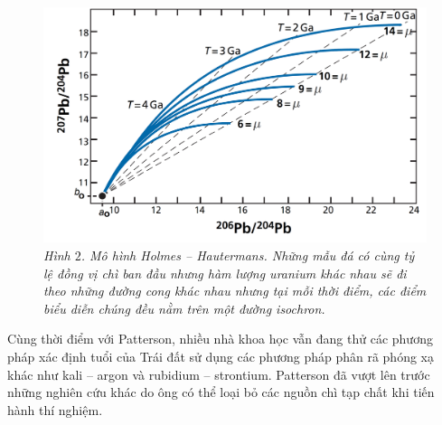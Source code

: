 \begin{multicols}{2}
	\begin{figure}[H]
		\vspace*{-5pt}
		\centering
		\captionsetup{labelformat= empty, justification=centering}
		\includegraphics[width= 1\linewidth]{2}
		\caption{\small\textit{\color{timhieukhoahoc}Hình $2$. Mô hình Holmes -- Hautermans. Những mẫu đá có cùng tỷ lệ đồng vị chì ban đầu nhưng hàm lượng uranium khác nhau sẽ đi theo những đường cong khác nhau nhưng tại mỗi thời điểm, các điểm biểu diễn chúng đều nằm trên một đường isochron.}}
	\end{figure}	
	Cùng thời điểm với Patterson, nhiều nhà khoa học vẫn đang thử các phương pháp xác định tuổi của Trái đất sử dụng các phương pháp phân rã phóng xạ khác như kali -- argon và rubidium -- strontium. Patterson đã vượt lên trước những nghiên cứu khác do ông có thể loại bỏ các nguồn chì tạp chất khi tiến hành thí nghiệm.
	\begin{figure}[H]
		\vspace*{-5pt}
		\centering
		\captionsetup{labelformat= empty, justification=centering}

\end{figure}
\end{multicols}
